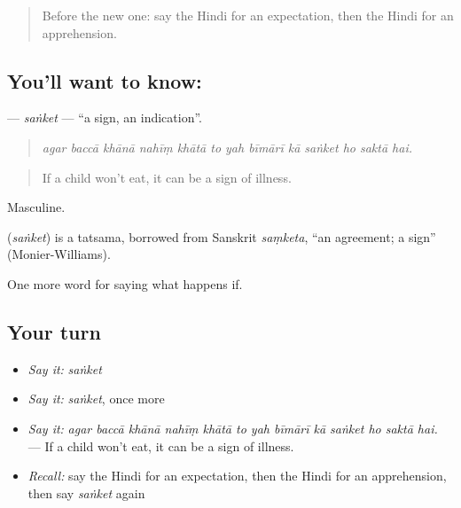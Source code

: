 \label{lesson:HI-C375-sanket}



\begin{quote}
Before the new one: say the Hindi for an expectation, then the Hindi for an apprehension.
\end{quote}

\subsection*{You'll want to know: }
\textbf{} — \emph{saṅket} — \textquotedblleft{}a sign, an indication\textquotedblright{}.

\begin{quote}
            
\end{quote}

\begin{quote}
\emph{agar baccā khānā nahīṃ khātā to yah bīmārī kā saṅket ho saktā hai.}
\end{quote}

\begin{quote}
If a child won't eat, it can be a sign of illness.
\end{quote}

Masculine.

\begin{cousinweb}
\textbf{} (\emph{saṅket}) is a tatsama, borrowed from Sanskrit \emph{saṃketa}, \textquotedblleft{}an agreement; a sign\textquotedblright{} (Monier-Williams).
\end{cousinweb}

\begin{grammarlens}[title={What you've built}]
One more word for saying what happens if.
\end{grammarlens}

\subsection*{Your turn}
\begin{itemize}
\raggedright
  \item \emph{Say it:} \emph{saṅket}
  \item \emph{Say it:} \emph{saṅket}, once more
  \item \emph{Say it:} \emph{agar baccā khānā nahīṃ khātā to yah bīmārī kā saṅket ho saktā hai.} — If a child won't eat, it can be a sign of illness.
  \item \emph{Recall:} say the Hindi for an expectation, then the Hindi for an apprehension, then say \emph{saṅket} again
\end{itemize}

